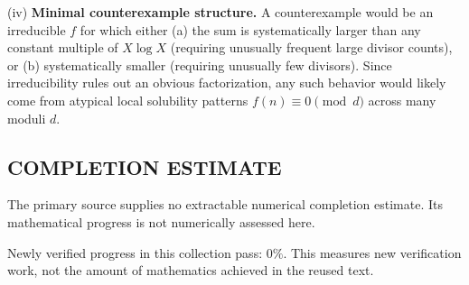 (iv) \textbf{Minimal counterexample structure.} A counterexample would be an irreducible $f$ for which either (a) the sum is systematically larger than any constant multiple of $X\log X$ (requiring unusually frequent large divisor counts), or (b) systematically smaller (requiring unusually few divisors).  Since irreducibility rules out an obvious factorization, any such behavior would likely come from atypical local solubility patterns $f(n)\equiv 0\pmod d$ across many moduli $d$.


\subsection*{COMPLETION ESTIMATE}
The primary source supplies no extractable numerical completion estimate. Its mathematical progress is not numerically assessed here.

Newly verified progress in this collection pass: $0\%$. This measures new verification work, not the amount of mathematics achieved in the reused text.
